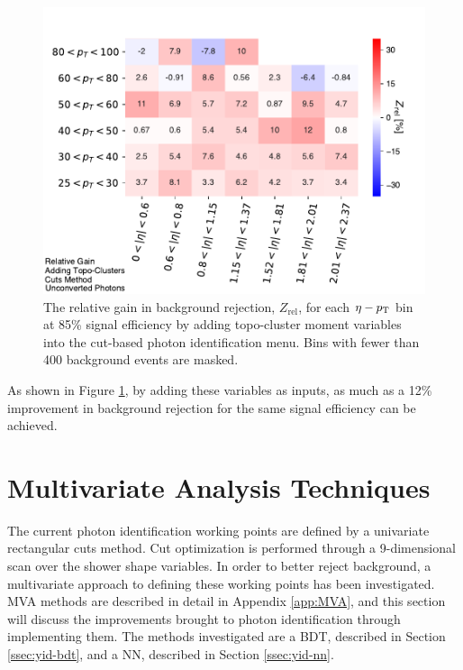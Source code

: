 \begin{figure}[!th]
    \centering
    \includegraphics[width=.85\textwidth]{chapters/chapter4_photonID/images/gain_topoAdded_unconverted.pdf}
    \caption[The relative gain in background rejection, $Z_{\text{rel}}$, for each $\eta-\pt$ bin at 85\% signal efficiency by adding topo-cluster moment variables into the cut-based photon identification menu]{The relative gain in background rejection, $Z_{\text{rel}}$, for each $\eta-\pt$ bin at 85\% signal efficiency by adding topo-cluster moment variables into the cut-based photon identification menu. Bins with fewer than 400 background events are masked.}
    \label{fig:gain-topo-clusters-added-unconverted}
\end{figure}
As shown in Figure \ref{fig:gain-topo-clusters-added-unconverted}, by adding these variables as inputs, as much as a 12\% improvement in background rejection for the same signal efficiency can be achieved.

\section{Multivariate Analysis Techniques} \label{sec:mva-yid}

The current photon identification working points are defined by a univariate rectangular cuts method. Cut optimization is performed through a 9-dimensional scan over the shower shape variables. In order to better reject background, a multivariate approach to defining these working points has been investigated. \gls{MVA} methods are described in detail in Appendix \ref{app:MVA}, and this section will discuss the improvements brought to photon identification through implementing them. The methods investigated are a \gls{BDT}, described in Section \ref{ssec:yid-bdt}, and a \gls{NN}, described in Section \ref{ssec:yid-nn}.


